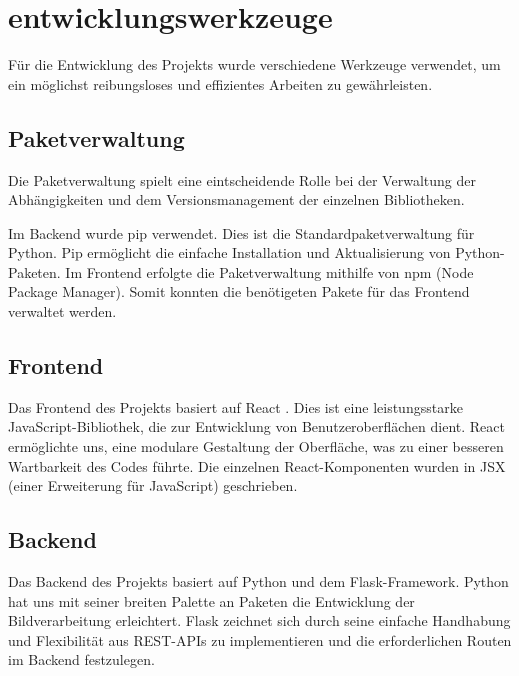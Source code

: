 \section{entwicklungswerkzeuge}
Für die Entwicklung des Projekts wurde verschiedene Werkzeuge verwendet, um ein möglichst reibungsloses und effizientes Arbeiten zu gewährleisten.

\subsection{Paketverwaltung}
Die Paketverwaltung spielt eine eintscheidende Rolle bei der Verwaltung der Abhängigkeiten und dem Versionsmanagement der einzelnen Bibliotheken.

Im Backend wurde \glqq{}pip\grqq{} verwendet. Dies ist die Standardpaketverwaltung für Python. \glqq{}Pip\grqq{} ermöglicht die einfache Installation und Aktualisierung von Python-Paketen. Im Frontend erfolgte die Paketverwaltung mithilfe von  \glqq{}npm\grqq{} (Node Package Manager). Somit konnten die benötigeten Pakete für das Frontend verwaltet werden.

\subsection{Frontend}
Das Frontend des Projekts basiert auf React \cite{react}. Dies ist eine leistungsstarke JavaScript-Bibliothek, die zur Entwicklung von Benutzeroberflächen dient. React ermöglichte uns, eine modulare Gestaltung der Oberfläche, was zu einer besseren Wartbarkeit des Codes führte. Die einzelnen React-Komponenten wurden in JSX (einer Erweiterung für JavaScript) geschrieben. 

\subsection{Backend}
Das Backend des Projekts basiert auf Python und dem Flask-Framework. Python hat uns mit seiner breiten Palette an Paketen die Entwicklung der Bildverarbeitung erleichtert. Flask zeichnet sich durch seine einfache Handhabung und Flexibilität aus REST-APIs zu implementieren und die erforderlichen Routen im Backend festzulegen.